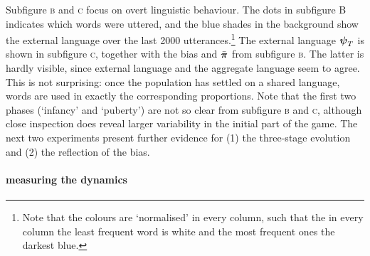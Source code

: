 \documentclass{../src/bcthesispart}
\begin{document}
 


Subfigure \textsc{b} and \textsc{c} focus on overt linguistic behaviour. 
The dots in subfigure B indicates which words were uttered, and the blue shades in the background show the external language over the last 2000 utterances.\footnote{%
	Note that the colours are ‘normalised’ in every column, such that the in every column the least frequent word is white and the most frequent ones the darkest blue.
	}
The external language $\boldsymbol{\mathbf{\psi}}_T$ is shown in subfigure \textsc{c}, together with the bias and $\bar{\boldsymbol{\mathbf{\pi}}}$ from subfigure \textsc{b}. 
The latter is hardly visible, since external language and the aggregate language seem to agree.
This is not surprising: once the population has settled on a shared language, words are used in exactly the corresponding proportions.
Note that the first two phases (‘infancy’ and ‘puberty’) are not so clear from subfigure \textsc{b} and \textsc{c}, although close inspection does reveal larger variability in the initial part of the game.
The next two experiments present further evidence for (1) the three-stage evolution and (2) the reflection of the bias.







\paragraph{measuring the dynamics}
\end{document}

